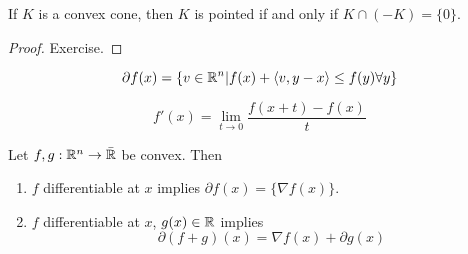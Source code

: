 \begin{proposition}
  If $K$ is a convex cone, then $K$ is pointed if and only if $K \cap
  (-K) = \{ 0 \}$.
\end{proposition}

\begin{proof}
  Exercise.
\end{proof}

\begin{defn}
  \begin{equation}
    \partial f(x) = \{ v \in \mathbb{R}^{n} | f(x) + \langle v, y - x \rangle
    \leq f(y) \forall y \}
  \end{equation}
  
  \begin{equation}
    f'(x) = \lim_{t \rightarrow 0} \frac{f(x + t) - f(x)}{t}
  \end{equation}
\end{defn}

\begin{proposition}
  Let $f, g: \mathbb{R}^{n} \rightarrow \bar {\mathbb{R}}$ be convex.  Then
  \begin{enumerate}
  \item \label{item:5} $f$ differentiable at $x$ implies $\partial f(x) = \{ \nabla
    f(x) \}$.
  \item \label{item:6} $f$ differentiable at $x$, $g(x) \in \mathbb{R}$ implies
    \begin{equation}
      \partial(f + g)(x) = \nabla f(x) + \partial g(x)
    \end{equation}
  \end{enumerate}
\end{proposition}

